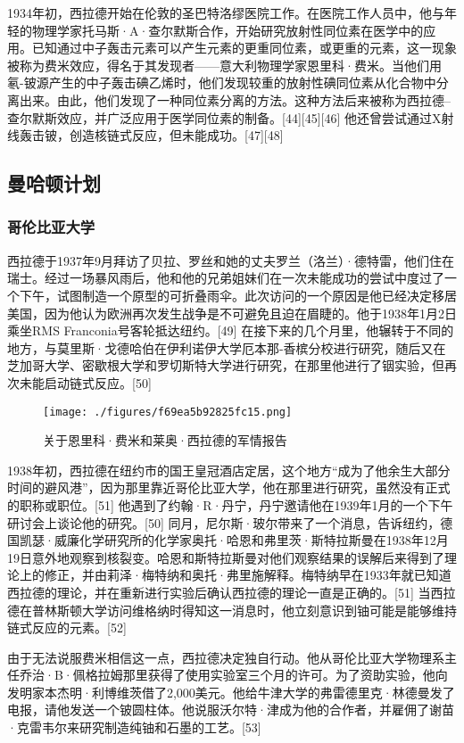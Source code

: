 1934年初，西拉德开始在伦敦的圣巴特洛缪医院工作。在医院工作人员中，他与年轻的物理学家托马斯·A·查尔默斯合作，开始研究放射性同位素在医学中的应用。已知通过中子轰击元素可以产生元素的更重同位素，或更重的元素，这一现象被称为费米效应，得名于其发现者——意大利物理学家恩里科·费米。当他们用氡-铍源产生的中子轰击碘乙烯时，他们发现较重的放射性碘同位素从化合物中分离出来。由此，他们发现了一种同位素分离的方法。这种方法后来被称为西拉德–查尔默斯效应，并广泛应用于医学同位素的制备。[44][45][46] 他还曾尝试通过X射线轰击铍，创造核链式反应，但未能成功。[47][48]
\subsection{曼哈顿计划}  
\subsubsection{哥伦比亚大学}  
西拉德于1937年9月拜访了贝拉、罗丝和她的丈夫罗兰（洛兰）·德特雷，他们住在瑞士。经过一场暴风雨后，他和他的兄弟姐妹们在一次未能成功的尝试中度过了一个下午，试图制造一个原型的可折叠雨伞。此次访问的一个原因是他已经决定移居美国，因为他认为欧洲再次发生战争是不可避免且迫在眉睫的。他于1938年1月2日乘坐RMS Franconia号客轮抵达纽约。[49] 在接下来的几个月里，他辗转于不同的地方，与莫里斯·戈德哈伯在伊利诺伊大学厄本那-香槟分校进行研究，随后又在芝加哥大学、密歇根大学和罗切斯特大学进行研究，在那里他进行了铟实验，但再次未能启动链式反应。[50]
\begin{figure}[ht]
\centering
\texttt{[image: ./figures/f69ea5b92825fc15.png]}
\caption{关于恩里科·费米和莱奥·西拉德的军情报告} \label{fig_Szilar_4}
\end{figure}
1938年初，西拉德在纽约市的国王皇冠酒店定居，这个地方“成为了他余生大部分时间的避风港”，因为那里靠近哥伦比亚大学，他在那里进行研究，虽然没有正式的职称或职位。[51] 他遇到了约翰·R·丹宁，丹宁邀请他在1939年1月的一个下午研讨会上谈论他的研究。[50] 同月，尼尔斯·玻尔带来了一个消息，告诉纽约，德国凯瑟·威廉化学研究所的化学家奥托·哈恩和弗里茨·斯特拉斯曼在1938年12月19日意外地观察到核裂变。哈恩和斯特拉斯曼对他们观察结果的误解后来得到了理论上的修正，并由莉泽·梅特纳和奥托·弗里施解释。梅特纳早在1933年就已知道西拉德的理论，并在重新进行实验后确认西拉德的理论一直是正确的。[51] 当西拉德在普林斯顿大学访问维格纳时得知这一消息时，他立刻意识到铀可能是能够维持链式反应的元素。[52]

由于无法说服费米相信这一点，西拉德决定独自行动。他从哥伦比亚大学物理系主任乔治·B·佩格拉姆那里获得了使用实验室三个月的许可。为了资助实验，他向发明家本杰明·利博维茨借了2,000美元。他给牛津大学的弗雷德里克·林德曼发了电报，请他发送一个铍圆柱体。他说服沃尔特·津成为他的合作者，并雇佣了谢苗·克雷韦尔来研究制造纯铀和石墨的工艺。[53]

